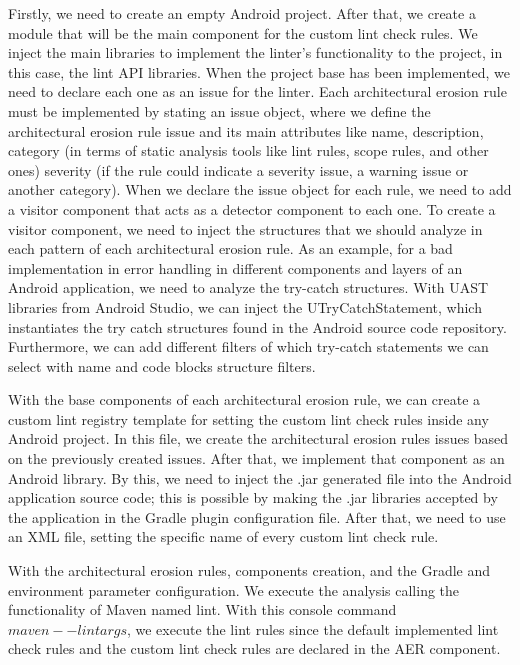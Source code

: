 Firstly, we need to create an empty Android project. After that, we create a module that will be the main component for the custom lint check rules. We inject the main libraries to implement the linter's functionality to the project, in this case, the lint API libraries. When the project base has been implemented, we need to declare each one as an issue for the linter. Each architectural erosion rule must be implemented by stating an issue object, where we define the architectural erosion rule issue and its main attributes like name, description, category (in terms of static analysis tools like lint rules, scope rules, and other ones) severity (if the rule could indicate a severity issue, a warning issue or another category). When we declare the issue object for each rule, we need to add a visitor component that acts as a detector component to each one. To create a visitor component, we need to inject the structures that we should analyze in each pattern of each architectural erosion rule. As an example, for a bad implementation in error handling in different components and layers of an Android application, we need to analyze the try-catch structures. With UAST libraries from Android Studio, we can inject the UTryCatchStatement, which instantiates the try catch structures found in the Android source code repository. Furthermore, we can add different filters of which try-catch statements we can select with name and code blocks structure filters.

With the base components of each architectural erosion rule, we can create a custom lint registry template for setting the custom lint check rules inside any Android project. In this file, we create the architectural erosion rules issues based on the previously created issues. After that, we implement that component as an Android library. By this, we need to inject the .jar generated file into the Android application source code; this is possible by making the .jar libraries accepted by the application in the Gradle plugin configuration file.  After that, we need to use an XML file, setting the specific name of every custom lint check rule.

With the architectural erosion rules, components creation, and the Gradle and environment parameter configuration. We execute the analysis calling the functionality of Maven named lint. With this console command $maven --lint args$, we execute the lint rules since the default implemented lint check rules and the custom lint check rules are declared in the AER component.

